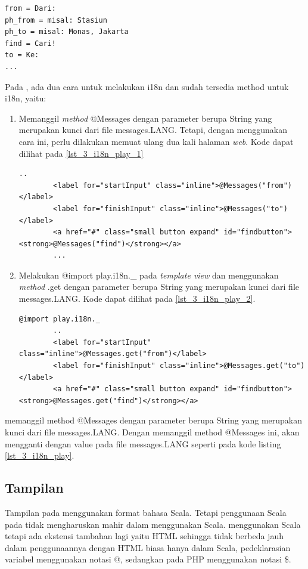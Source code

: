 \begin{lstlisting}[caption=Script \play untuk Bahasa Indonesia,label = {lst_3_i18n_play_id}]
from = Dari:
ph_from = misal: Stasiun
ph_to = misal: Monas, Jakarta
find = Cari!
to = Ke:
...
\end{lstlisting}

Pada \play, ada dua cara untuk melakukan i18n dan sudah tersedia method untuk i18n, yaitu:
\begin{enumerate}
	\item Memanggil \textit{method} @Messages dengan parameter berupa String yang merupakan kunci dari file messages.LANG. Tetapi, dengan menggunakan cara ini, perlu dilakukan memuat ulang dua kali halaman \textit{web}. Kode dapat dilihat pada \ref{lst_3_i18n_play_1}
	
	\begin{lstlisting}[caption=Script \play untuk Internationalization,label = {lst_3_i18n_play_1}]
		..
		<label for="startInput" class="inline">@Messages("from")</label>
		<label for="finishInput" class="inline">@Messages("to")</label>
		<a href="#" class="small button expand" id="findbutton"><strong>@Messages("find")</strong></a>
		...
	\end{lstlisting}
	
	
	\item Melakukan @import play.i18n.\_ pada \textit{template view} dan menggunakan \textit{method} \@Messages.get dengan parameter berupa String yang merupakan kunci dari file messages.LANG. Kode dapat dilihat pada \ref{lst_3_i18n_play_2}.
	
		\begin{lstlisting}[caption=Script \play untuk Internationalization,label = {lst_3_i18n_play_2}]
		@import play.i18n._
		..
		<label for="startInput" class="inline">@Messages.get("from")</label>
		<label for="finishInput" class="inline">@Messages.get("to")</label>
		<a href="#" class="small button expand" id="findbutton"><strong>@Messages.get("find")</strong></a>
	\end{lstlisting}
	
\end{enumerate}
 memanggil method @Messages dengan parameter berupa String yang merupakan kunci dari file messages.LANG. Dengan memanggil method @Messages ini, akan mengganti dengan value pada file messages.LANG seperti pada kode listing \ref{lst_3_i18n_play}.

\subsection{Tampilan}
Tampilan pada \play menggunakan format bahasa Scala. Tetapi penggunaan Scala pada \play tidak mengharuskan mahir dalam menggunakan Scala. \play menggunakan Scala tetapi ada ekstensi tambahan lagi yaitu HTML sehingga tidak berbeda jauh dalam penggunaannya dengan HTML biasa hanya dalam Scala, pedeklarasian variabel menggunakan notasi @, sedangkan pada PHP menggunakan notasi \$.



